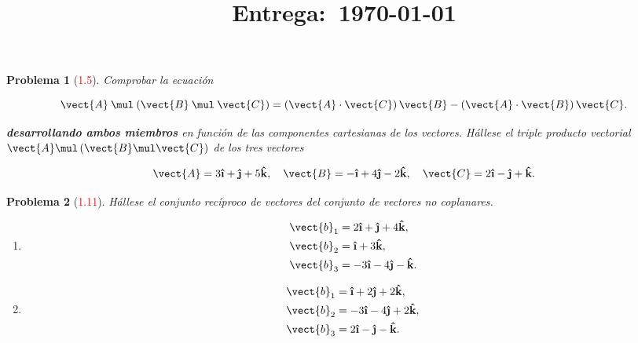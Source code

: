 \documentclass[12pt]{article}
\title{
    \textbf{\homeworknumber}\\
    \normalsize\vspace{0.1in}\small{\textbf{Entrega}:~\today}
    \vspace{-1.5in}
}
\author{}
\date{}
\theoremstyle{break}
\newtheorem{exercise}{Problema}
\theoremstyle{nonumberbreak}
\newcommand*{\uveci}{{\bm{\hat{\textnormal{\bfseries\i}}}}}
\newcommand*{\uvecj}{{\bm{\hat{\textnormal{\bfseries\j}}}}}
\DeclareRobustCommand{\uvec}[1]{{%
  \ifcsname uvec#1\endcsname
     \csname uvec#1\endcsname
   \else
    \bm{\hat{\mathbf{#1}}}%
   \fi
}}%
\newcommand*{\uvectk}{\uvec{k}}
\newcommand*{\dotprod}[2]{#1 \mathbin{\cdot} #2\xspace}
\newcommand*{\crossprod}[2]{#1 \mathbin{\mul} #2\xspace}
\begin{document}
    \maketitle
    \thispagestyle{fancy}

    \begin{exercise}[\textcolor{red}{1.5}]
      Comprobar la ecuación

      \begin{equation*}
        \crossprod{\vect{A}}{\left(\crossprod{\vect{B}}{\vect{C}}\right)} = \left(\dotprod{\vect{A}}{\vect{C}}\right)\vect{B} - \left(\dotprod{\vect{A}}{\vect{B}}\right)\vect{C}.
      \end{equation*}

      \textbf{desarrollando ambos miembros} en función de las componentes cartesianas de los vectores. Hállese el triple producto vectorial \(\vect{A} \mul \left(\vect{B} \mul \vect{C}\right)\) de los tres vectores

      \begin{equation*}
        \vect{A} = 3\uveci + \uvecj + 5\uvectk,\quad \vect{B} = -\uveci + 4\uvecj - 2\uvectk,\quad \vect{C} = 2\uveci - \uvecj + \uvectk.
      \end{equation*}
    \end{exercise}
    
    \begin{exercise}[\textcolor{red}{1.11}]
      Hállese el conjunto recíproco de vectores del conjunto de vectores no coplanares.

      \begin{enumerate}[label = \alph*)]
        \item 
        
          \begin{align*}
            \vect{b}_{1} &= 2\uveci + \uvecj + 4\uvectk,\\
            \vect{b}_{2} &= \uveci + 3\uvectk,\\
            \vect{b}_{3} &= -3\uveci - 4\uvecj - \uvectk.
          \end{align*}

        \item 
          
          \begin{align*}
            \vect{b}_{1} &= \uveci + 2\uvecj + 2\uvectk,\\
            \vect{b}_{2} &= -3\uveci - 4\uvecj + 2\uvectk,\\
            \vect{b}_{3} &= 2\uveci - \uvecj - \uvectk.
          \end{align*}
      \end{enumerate}
    \end{exercise}
    
\end{document}
